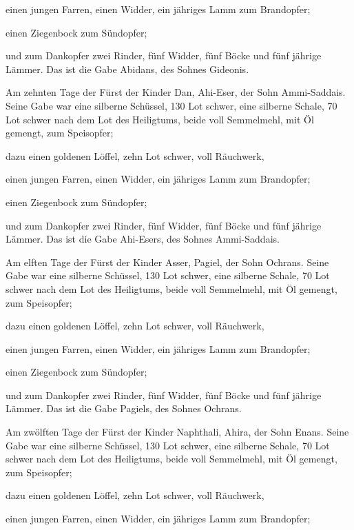  einen jungen Farren, einen Widder, ein jähriges Lamm zum
Brandopfer;

 einen Ziegenbock zum Sündopfer;

 und zum Dankopfer zwei Rinder, fünf Widder, fünf Böcke
und fünf jährige Lämmer. Das ist die Gabe Abidans, des Sohnes Gideonis.

 Am zehnten Tage der Fürst der Kinder Dan, Ahi-Eser, der
Sohn Ammi-Saddais.  Seine Gabe war eine silberne
Schüssel, 130 Lot schwer, eine silberne Schale, 70 Lot schwer nach dem
Lot des Heiligtums, beide voll Semmelmehl, mit Öl gemengt, zum
Speisopfer;

 dazu einen goldenen Löffel, zehn Lot schwer, voll
Räuchwerk,

 einen jungen Farren, einen Widder, ein jähriges Lamm zum
Brandopfer;

 einen Ziegenbock zum Sündopfer;

 und zum Dankopfer zwei Rinder, fünf Widder, fünf Böcke
und fünf jährige Lämmer. Das ist die Gabe Ahi-Esers, des Sohnes
Ammi-Saddais.

 Am elften Tage der Fürst der Kinder Asser, Pagiel, der
Sohn Ochrans.  Seine Gabe war eine silberne Schüssel, 130
Lot schwer, eine silberne Schale, 70 Lot schwer nach dem Lot des
Heiligtums, beide voll Semmelmehl, mit Öl gemengt, zum Speisopfer;

 dazu einen goldenen Löffel, zehn Lot schwer, voll
Räuchwerk,

 einen jungen Farren, einen Widder, ein jähriges Lamm zum
Brandopfer;

 einen Ziegenbock zum Sündopfer;

 und zum Dankopfer zwei Rinder, fünf Widder, fünf Böcke
und fünf jährige Lämmer. Das ist die Gabe Pagiels, des Sohnes Ochrans.

 Am zwölften Tage der Fürst der Kinder Naphthali, Ahira,
der Sohn Enans.  Seine Gabe war eine silberne Schüssel,
130 Lot schwer, eine silberne Schale, 70 Lot schwer nach dem Lot des
Heiligtums, beide voll Semmelmehl, mit Öl gemengt, zum Speisopfer;

 dazu einen goldenen Löffel, zehn Lot schwer, voll
Räuchwerk,

 einen jungen Farren, einen Widder, ein jähriges Lamm zum
Brandopfer;

